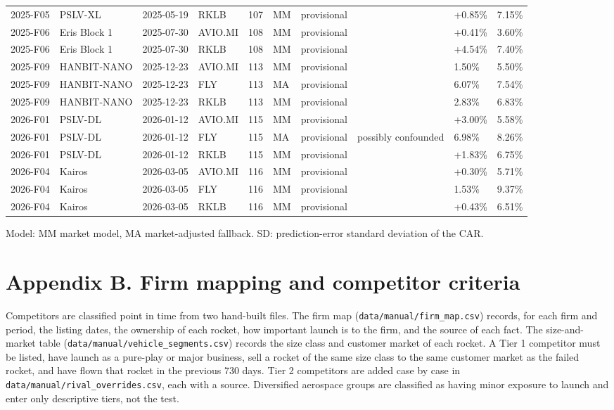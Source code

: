 \documentclass[12pt,a4paper]{article}
\begin{document}
{\begin{xltabular}{\textwidth}{lllllllXll}
2025-F05 & PSLV-XL & 2025-05-19 & RKLB & 107 & MM & provisional &  & +0.85\% & 7.15\% \\
2025-F06 & Eris Block 1 & 2025-07-30 & AVIO.MI & 108 & MM & provisional &  & +0.41\% & 3.60\% \\
2025-F06 & Eris Block 1 & 2025-07-30 & RKLB & 108 & MM & provisional &  & +4.54\% & 7.40\% \\
2025-F09 & HANBIT-NANO & 2025-12-23 & AVIO.MI & 113 & MM & provisional &  & \textminus{}1.50\% & 5.50\% \\
2025-F09 & HANBIT-NANO & 2025-12-23 & FLY & 113 & MA & provisional &  & \textminus{}6.07\% & 7.54\% \\
2025-F09 & HANBIT-NANO & 2025-12-23 & RKLB & 113 & MM & provisional &  & \textminus{}2.83\% & 6.83\% \\
2026-F01 & PSLV-DL & 2026-01-12 & AVIO.MI & 115 & MM & provisional &  & +3.00\% & 5.58\% \\
2026-F01 & PSLV-DL & 2026-01-12 & FLY & 115 & MA & provisional & possibly confounded & \textminus{}6.98\% & 8.26\% \\
2026-F01 & PSLV-DL & 2026-01-12 & RKLB & 115 & MM & provisional &  & +1.83\% & 6.75\% \\
2026-F04 & Kairos & 2026-03-05 & AVIO.MI & 116 & MM & provisional &  & +0.30\% & 5.71\% \\
2026-F04 & Kairos & 2026-03-05 & FLY & 116 & MM & provisional &  & \textminus{}1.53\% & 9.37\% \\
2026-F04 & Kairos & 2026-03-05 & RKLB & 116 & MM & provisional &  & +0.43\% & 6.51\% \\
\bottomrule
\end{xltabular}}
\vspace{6pt}

Model: MM market model, MA market-adjusted fallback. SD: prediction-error standard deviation of the CAR.

\section*{\hypertarget{apx-b}{}Appendix B. Firm mapping and competitor criteria}
Competitors are classified point in time from two hand-built files. The firm map (\texttt{data/\allowbreak{}manual/\allowbreak{}firm\_\allowbreak{}map.csv}) records, for each firm and period, the listing dates, the ownership of each rocket, how important launch is to the firm, and the source of each fact. The size-and-market table (\texttt{data/\allowbreak{}manual/\allowbreak{}vehicle\_\allowbreak{}segments.csv}) records the size class and customer market of each rocket. A Tier 1 competitor must be listed, have launch as a pure-play or major business, sell a rocket of the same size class to the same customer market as the failed rocket, and have flown that rocket in the previous 730 days. Tier 2 competitors are added case by case in \texttt{data/\allowbreak{}manual/\allowbreak{}rival\_\allowbreak{}overrides.csv}, each with a source. Diversified aerospace groups are classified as having minor exposure to launch and enter only descriptive tiers, not the test.
\end{document}
